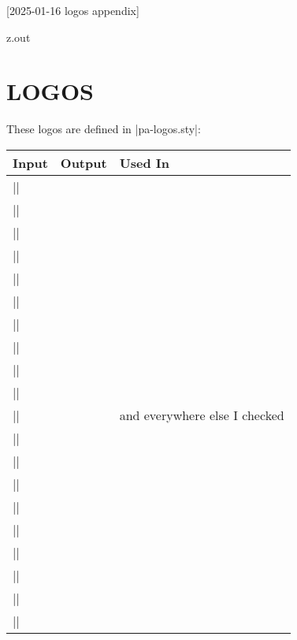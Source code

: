 [2025-01-16 logos appendix]

\begin{VerbatimOut}{z.out}
\chapter{LOGOS}

These logos are defined in |pa-logos.sty|:

\begin{tabular}{@{}lll@{}}
  \toprule
  \bfseries Input& \bfseries Output& \bfseries Used In\\
  \midrule
  |\AMSmathLogo|& \AMSmathLogo\\[2pt]
  |\BibLaTeXLogo|& \BibLaTeXLogo\\[2pt]
  |\BiberLogo|& \BiberLogo\\[2pt]
  |\CalligraphicAMSLaTeXLogo|& \CalligraphicAMSLaTeXLogo\\[2pt]
  |\CircuiTikZLogo|& \CircuiTikZLogo\\[2pt]
  |\CTANLogo|& \CTANLogo\\[2pt]
  |\LaTeXLogo|& \LaTeXLogo\\[2pt]
  |\LuaLaTeXLogo|& \LuaLaTeXLogo\\[2pt]
  |\METAFONTLogo|& \METAFONTLogo\\[2pt]
  |\METAPOSTLogo|& \METAPOSTLogo& \cite{hobby2024}\\[2pt]
  |\MetaPostLogo|& \MetaPostLogo& \cite{hobby2024} and everywhere else I checked\\[2pt]
  |\NonCalligraphicAMSLaTeXLogo|& \NonCalligraphicAMSLaTeXLogo\\[2pt]
  |\PurdueThesisLogo|& \PurdueThesisLogo\\[2pt]
  |\PuThLogo|& \PuThLogo\\[2pt]
  |\siunitxLogo|& \siunitxLogo\\[2pt]
  |\TeXLogo|& \TeXLogo\\[2pt]
  |\TeXLiveLogo|& \TeXLiveLogo\\[2pt]
  |\TikZLogo|& \TikZLogo\\[2pt]
  |\TEXUsersGroupLogo|& \TeXUsersGroupLogo\\[2pt]
  |\TUGboatLogo|& \TUGboatLogo\\[2pt]
  \bottomrule
\end{tabular}
\end{VerbatimOut}

\MyIO
